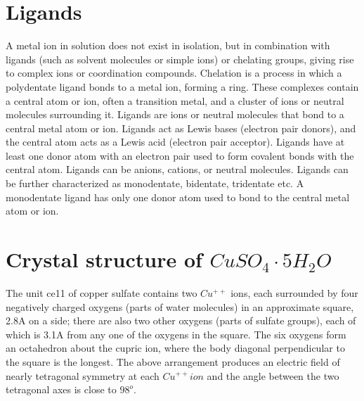 \documentclass[openany,11pt,a4paper]{report}
\begin{document}
\section{Ligands}
A metal ion in solution does not exist in isolation, but in combination with ligands (such as solvent molecules or simple ions) or chelating groups, giving rise to complex ions or coordination compounds. Chelation is a process in which a polydentate ligand bonds to a metal ion, forming a ring. These complexes contain a central atom or ion, often a transition metal, and a cluster of ions or neutral molecules surrounding it. Ligands are ions or neutral molecules that bond to a central metal atom or ion. Ligands act as Lewis bases (electron pair donors), and the central atom acts as a Lewis acid (electron pair acceptor). Ligands have at least one donor atom with an electron pair used to form covalent bonds with the central atom. Ligands can be anions, cations, or neutral molecules. Ligands can be further characterized as monodentate, bidentate, tridentate etc. A monodentate ligand has only one donor atom used to bond to the central metal atom or ion. \cite{ligand}

\section{Crystal structure of $CuSO_{4}\cdot 5H_{2}O$}
The unit ce11 of copper sulfate contains two
$Cu^{++}$ ions, each surrounded by four negatively
charged oxygens (parts of water molecules)
in an approximate square, 2.8A on a side; there are
also two other oxygens (parts of sulfate groups),
each of which is 3.1A from any one of the oxygens
in the square. The six oxygens form an octahedron
about the cupric ion, where the body diagonal perpendicular to the square is the longest. The above arrangement produces an electric
field of nearly tetragonal symmetry at each
$Cu^{++} ion$ and the angle between the two tetragonal axes is close to $98^{o}$. \cite{crystalepr}
\end{document}
